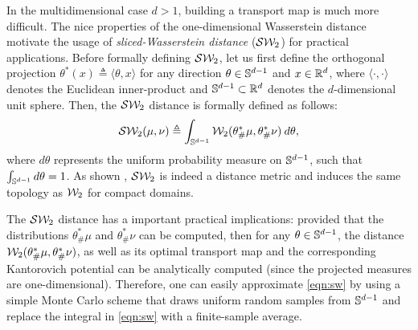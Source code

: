 In the multidimensional case $d > 1$, building a transport map is much more difficult. The nice properties of the one-dimensional Wasserstein distance motivate the usage of \emph{sliced-Wasserstein distance} (${\cal S}{\cal W}_2$) for practical applications. Before formally defining ${\cal S}{\cal W}_2$, let us first define the orthogonal projection $\theta^* (x) \triangleq \langle \theta, x \rangle$ for any direction $\theta \in \mathbb{S}^{d-1}$ and $x \in \mathbb{R}^d$, where $\langle \cdot, \cdot \rangle$ denotes the Euclidean inner-product and $\mathbb{S}^{d-1} \subset \mathbb{R}^d$ denotes the $d$-dimensional unit sphere. Then, the ${\cal S}{\cal W}_2$ distance is formally defined as follows:
\begin{align}
{\cal S}{\cal W}_2(\mu,\nu) \triangleq \int_{\mathbb{S}^{d-1}} {\cal W}_2 (\theta^*_\#\mu, \theta^*_\#\nu) \> d \theta, \label{eqn:sw}
\end{align}
where $d\theta$ represents the uniform probability measure on $\mathbb{S}^{d-1}$, such that $\int_{\mathbb{S}^{d-1}} d \theta = 1$. As shown \cite{bonnotte2013unidimensional}, ${\cal S}{\cal W}_2$ is indeed a distance metric and induces the same topology as ${\cal W}_2$ for compact domains.

The ${\cal S}{\cal W}_2$ distance has a important practical implications: provided that the distributions $\theta^*_\#\mu$ and $\theta^*_\#\nu$ can be computed, then for any $\theta \in \mathbb{S}^{d-1}$, the distance ${\cal W}_2 (\theta^*_\#\mu, \theta^*_\#\nu)$, as well as its optimal transport map and the corresponding Kantorovich potential can be analytically computed (since the projected measures are one-dimensional). Therefore, one can easily approximate \eqref{eqn:sw} by using a simple Monte Carlo scheme that draws uniform random samples from $\mathbb{S}^{d-1}$ and replace the integral in \eqref{eqn:sw} with a finite-sample average.

